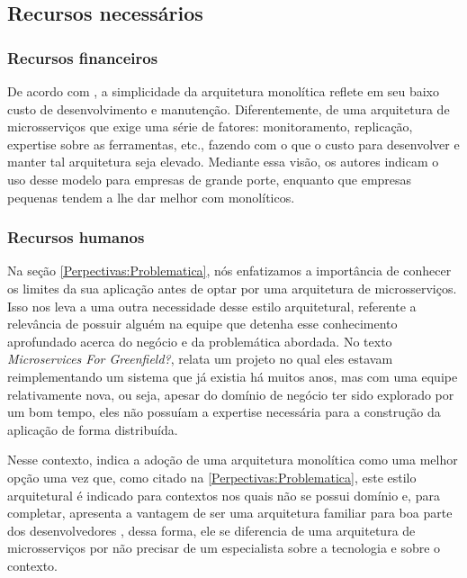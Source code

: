 \subsection{Recursos necessários}

\subsubsection{Recursos financeiros}

De acordo com \cite{Richards2020:FundamentalsOfSoftwareArchitecture}, a simplicidade da arquitetura
monolítica reflete em seu baixo custo de desenvolvimento e manutenção. Diferentemente, de uma arquitetura
de microsserviços que exige uma série de fatores: monitoramento, replicação, expertise sobre as
ferramentas, etc., fazendo com o que o custo para desenvolver e manter tal arquitetura seja elevado.
Mediante essa visão, os autores indicam o uso desse modelo para empresas de grande porte,
enquanto que empresas pequenas tendem a lhe dar melhor com monolíticos.

\subsubsection{Recursos humanos}

Na seção \autoref{Perpectivas:Problematica}, nós enfatizamos a importância de conhecer os limites da
sua aplicação antes de optar por uma arquitetura de microsserviços. Isso nos leva a uma outra necessidade desse
estilo arquitetural, referente a relevância de possuir alguém na equipe que detenha esse conhecimento
aprofundado acerca do negócio e da problemática abordada. No texto \textit{Microservices For
Greenfield?},  relata um projeto no qual eles estavam reimplementando
um sistema que já existia há muitos anos, mas com uma equipe relativamente nova, ou seja, apesar do
domínio de negócio ter sido explorado por um bom tempo, eles não possuíam a expertise necessária
para a construção da aplicação de forma distribuída.

Nesse contexto,  indica a adoção de uma arquitetura monolítica como uma
melhor opção uma vez que, como citado na \autoref{Perpectivas:Problematica}, este estilo arquitetural
é indicado para contextos nos quais não se possui domínio e, para completar, apresenta a vantagem de ser uma
arquitetura familiar para boa parte dos desenvolvedores
\cite{Richards2020:FundamentalsOfSoftwareArchitecture}, dessa forma, ele se diferencia de uma
arquitetura de microsserviços por não precisar de um especialista sobre a tecnologia e sobre o contexto.


